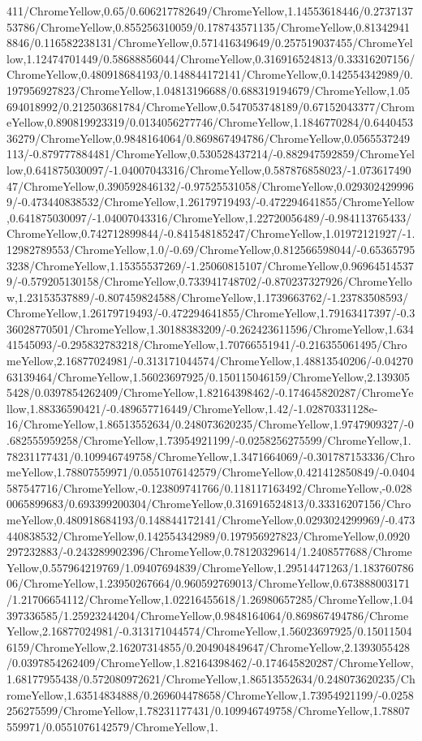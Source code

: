 {\begin{tikzternal}
411/ChromeYellow,0.65/0.606217782649/ChromeYellow,1.14553618446/0.273713753786/ChromeYellow,0.855256310059/0.178743571135/ChromeYellow,0.813429418846/0.116582238131/ChromeYellow,0.571416349649/0.257519037455/ChromeYellow,1.12474701449/0.58688856044/ChromeYellow,0.316916524813/0.33316207156/ChromeYellow,0.480918684193/0.148844172141/ChromeYellow,0.142554342989/0.197956927823/ChromeYellow,1.04813196688/0.688319194679/ChromeYellow,1.05694018992/0.212503681784/ChromeYellow,0.547053748189/0.67152043377/ChromeYellow,0.890819923319/0.0134056277746/ChromeYellow,1.1846770284/0.644045336279/ChromeYellow,0.9848164064/0.869867494786/ChromeYellow,0.0565537249113/-0.879777884481/ChromeYellow,0.530528437214/-0.882947592859/ChromeYellow,0.641875030097/-1.04007043316/ChromeYellow,0.587876858023/-1.07361749047/ChromeYellow,0.390592846132/-0.97525531058/ChromeYellow,0.0293024299969/-0.473440838532/ChromeYellow,1.26179719493/-0.472294641855/ChromeYellow,0.641875030097/-1.04007043316/ChromeYellow,1.22720056489/-0.984113765433/ChromeYellow,0.742712899844/-0.841548185247/ChromeYellow,1.01972121927/-1.12982789553/ChromeYellow,1.0/-0.69/ChromeYellow,0.812566598044/-0.653657953238/ChromeYellow,1.15355537269/-1.25060815107/ChromeYellow,0.969645145379/-0.579205130158/ChromeYellow,0.733941748702/-0.870237327926/ChromeYellow,1.23153537889/-0.807459824588/ChromeYellow,1.1739663762/-1.23783508593/ChromeYellow,1.26179719493/-0.472294641855/ChromeYellow,1.79163417397/-0.336028770501/ChromeYellow,1.30188383209/-0.262423611596/ChromeYellow,1.63441545093/-0.295832783218/ChromeYellow,1.70766551941/-0.216355061495/ChromeYellow,2.16877024981/-0.313171044574/ChromeYellow,1.48813540206/-0.0427063139464/ChromeYellow,1.56023697925/0.150115046159/ChromeYellow,2.1393055428/0.0397854262409/ChromeYellow,1.82164398462/-0.174645820287/ChromeYellow,1.88336590421/-0.489657716449/ChromeYellow,1.42/-1.02870331128e-16/ChromeYellow,1.86513552634/0.248073620235/ChromeYellow,1.9747909327/-0.682555959258/ChromeYellow,1.73954921199/-0.0258256275599/ChromeYellow,1.78231177431/0.109946749758/ChromeYellow,1.3471664069/-0.301787153336/ChromeYellow,1.78807559971/0.0551076142579/ChromeYellow,0.421412850849/-0.0404587547716/ChromeYellow,-0.123809741766/0.118117163492/ChromeYellow,-0.0280065899683/0.693399200304/ChromeYellow,0.316916524813/0.33316207156/ChromeYellow,0.480918684193/0.148844172141/ChromeYellow,0.0293024299969/-0.473440838532/ChromeYellow,0.142554342989/0.197956927823/ChromeYellow,0.0920297232883/-0.243289902396/ChromeYellow,0.78120329614/1.2408577688/ChromeYellow,0.557964219769/1.09407694839/ChromeYellow,1.29514471263/1.18376078606/ChromeYellow,1.23950267664/0.960592769013/ChromeYellow,0.673888003171/1.21706654112/ChromeYellow,1.02216455618/1.26980657285/ChromeYellow,1.04397336585/1.25923244204/ChromeYellow,0.9848164064/0.869867494786/ChromeYellow,2.16877024981/-0.313171044574/ChromeYellow,1.56023697925/0.150115046159/ChromeYellow,2.16207314855/0.204904849647/ChromeYellow,2.1393055428/0.0397854262409/ChromeYellow,1.82164398462/-0.174645820287/ChromeYellow,1.68177955438/0.572080972621/ChromeYellow,1.86513552634/0.248073620235/ChromeYellow,1.63514834888/0.269604478658/ChromeYellow,1.73954921199/-0.0258256275599/ChromeYellow,1.78231177431/0.109946749758/ChromeYellow,1.78807559971/0.0551076142579/ChromeYellow,1.
\end{tikzternal}}
